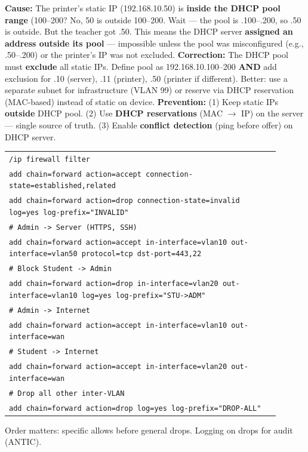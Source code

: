 \documentclass[11pt]{article}
\begin{document}
\begin{corrige}[Exercise 8]
\textbf{Cause:} The printer's static IP (192.168.10.50) is \textbf{inside the DHCP pool range} (100–200? No, 50 is outside 100–200. Wait — the pool is .100–.200, so .50 is outside. But the teacher got .50. This means the DHCP server \textbf{assigned an address outside its pool} — impossible unless the pool was misconfigured (e.g., .50–.200) or the printer's IP was not excluded.
\textbf{Correction:} The DHCP pool must \textbf{exclude} all static IPs. Define pool as 192.168.10.100–200 \textbf{AND} add exclusion for .10 (server), .11 (printer), .50 (printer if different). Better: use a separate subnet for infrastructure (VLAN 99) or reserve via DHCP reservation (MAC-based) instead of static on device.
\textbf{Prevention:} (1) Keep static IPs \textbf{outside} DHCP pool. (2) Use \textbf{DHCP reservations} (MAC $\rightarrow$ IP) on the server — single source of truth. (3) Enable \textbf{conflict detection} (ping before offer) on DHCP server.
\end{corrige}

\begin{corrige}[Exercise 9]
\begin{center}
\begin{tabular}{|p{0.9\linewidth}|}\hline
\texttt{/ip firewall filter}\\
\texttt{add chain=forward action=accept connection-state=established,related}\\
\texttt{add chain=forward action=drop connection-state=invalid log=yes log-prefix="INVALID"}\\
\texttt{\# Admin -> Server (HTTPS, SSH)}\\
\texttt{add chain=forward action=accept in-interface=vlan10 out-interface=vlan50 protocol=tcp dst-port=443,22}\\
\texttt{\# Block Student -> Admin}\\
\texttt{add chain=forward action=drop in-interface=vlan20 out-interface=vlan10 log=yes log-prefix="STU->ADM"}\\
\texttt{\# Admin -> Internet}\\
\texttt{add chain=forward action=accept in-interface=vlan10 out-interface=wan}\\
\texttt{\# Student -> Internet}\\
\texttt{add chain=forward action=accept in-interface=vlan20 out-interface=wan}\\
\texttt{\# Drop all other inter-VLAN}\\
\texttt{add chain=forward action=drop log=yes log-prefix="DROP-ALL"}\\\hline
\end{tabular}
\end{center}
Order matters: specific allows before general drops. Logging on drops for audit (ANTIC).
\end{corrige}
\end{document}
